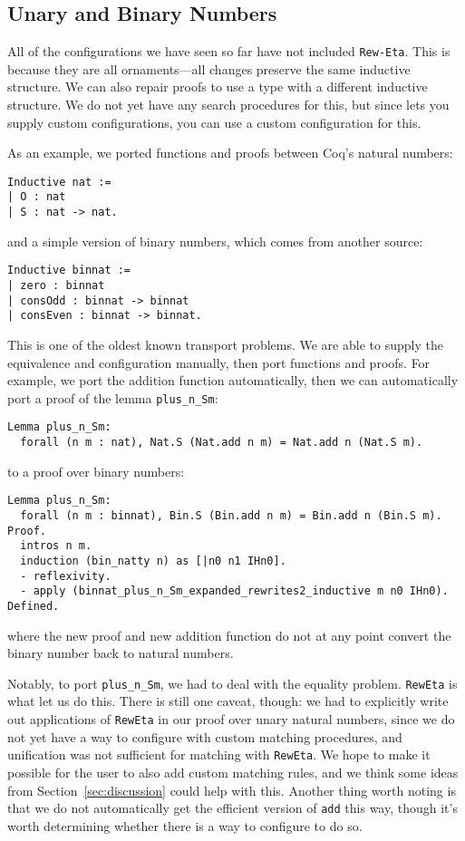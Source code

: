 \subsection{Unary and Binary Numbers}
\label{sec:bin}

All of the configurations we have seen so far have not included \lstinline{Rew-Eta}.
This is because they are all ornaments---all changes preserve the same inductive structure.
We can also repair proofs to use a type with a different inductive structure.
We do not yet have any search procedures for this, but since \toolname lets you supply
custom configurations, you can use a custom configuration for this.

As an example, we ported functions and proofs between Coq's natural numbers:

\begin{lstlisting}
Inductive nat :=
| O : nat
| S : nat -> nat.
\end{lstlisting}
and a simple version of binary numbers, which comes from another source:

\begin{lstlisting}
Inductive binnat :=
| zero : binnat
| consOdd : binnat -> binnat
| consEven : binnat -> binnat.
\end{lstlisting}
This is one of the oldest known transport problems.
We are able to supply the equivalence and configuration manually,
then port functions and proofs.
For example, we port the addition function automatically,
then we can automatically port a proof of the lemma \lstinline{plus_n_Sm}:

\begin{lstlisting}
Lemma plus_n_Sm:
  forall (n m : nat), Nat.S (Nat.add n m) = Nat.add n (Nat.S m).
\end{lstlisting}
to a proof over binary numbers:

\begin{lstlisting}
Lemma plus_n_Sm:
  forall (n m : binnat), Bin.S (Bin.add n m) = Bin.add n (Bin.S m).
Proof.
  intros n m.
  induction (bin_natty n) as [|n0 n1 IHn0].
  - reflexivity.
  - apply (binnat_plus_n_Sm_expanded_rewrites2_inductive m n0 IHn0).
Defined.
\end{lstlisting}
where the new proof and new addition function do not at any point convert
the binary number back to natural numbers.

Notably, to port \lstinline{plus_n_Sm}, we had to deal with the equality problem.
\lstinline{RewEta} is what let us do this.
There is still one caveat, though: we had to explicitly write out applications of \lstinline{RewEta}
in our proof over unary natural numbers, since we do not yet have a way to configure \toolname with custom
matching procedures, and unification was not sufficient for matching with \lstinline{RewEta}.
We hope to make it possible for the user to also add custom matching rules,
and we think some ideas from Section~\ref{sec:discussion} could help with this.
Another thing worth noting is that we do not automatically get the efficient version of \lstinline{add} this way,
though it's worth determining whether there is a way to configure \toolname to do so.

